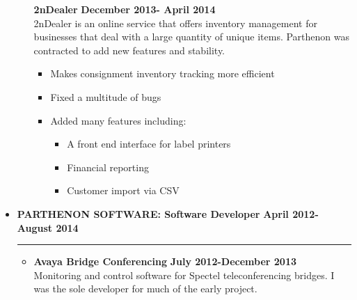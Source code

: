 \documentclass[overlapped]{res}
\begin{document}
\begin{resume}
\begin{itemize}[leftmargin=0in]
\begin{itemize}[leftmargin=0in]
\begin{samepage}
\begin{itemize}
                    \end{itemize}
                \end{samepage}
                \begin{samepage}
                    \textbf{2nDealer} \hfill \textbf{December 2013- April 2014} \\
                    2nDealer is an online service that offers inventory management for businesses that deal with a large quantity of unique items. 
                    Parthenon was contracted to add new features and stability.
                    \begin{itemize}
                        \item[\textbullet] Makes consignment inventory tracking more efficient
                        \item[\textbullet] Fixed a multitude of bugs
                        \item[\textbullet] Added many features including:
                            \begin{itemize} 
                                \item[\textbullet] A front end interface for label printers 
                                \item[\textbullet] Financial reporting
                                \item[\textbullet] Customer import via CSV 
                            \end{itemize}
                    \end{itemize}
                \end{samepage}
        \end{itemize}
        \vspace{0.125in}
    \item[] 
        \textbf{PARTHENON SOFTWARE: Software Developer} \hfill \textbf{April 2012-August 2014} \\[-0.1in] \rule{\textwidth}{0.5pt}
        \begin{itemize}[leftmargin=0in]
            \item[] 
                \begin{samepage}
                    \textbf{Avaya Bridge Conferencing} \hfill \textbf{July 2012-December 2013} \\
                    Monitoring and control software for Spectel teleconferencing bridges. I was the sole developer for much of the early project.
                    \begin{itemize}

\end{itemize}
\end{samepage}
\end{itemize}
\end{itemize}
\end{resume}
\end{document}
